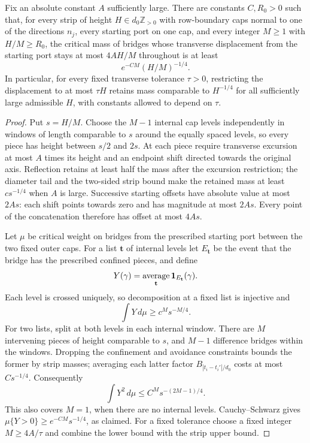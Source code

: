 \begin{lemma}\label{lem:narrow-channel-bridges}
Fix an absolute constant $A$ sufficiently large. There are constants $C,R_0>0$ such that, for every strip of height $H\in d_0\mathbb Z_{>0}$ with row-boundary caps normal to one of the directions $n_j$, every starting port on one cap, and every integer $M\ge1$ with $H/M\ge R_0$, the critical mass of bridges whose transverse displacement from the starting port stays at most $4AH/M$ throughout is at least
\[
 e^{-C M} (H/M)^{-1/4}.
\]
In particular, for every fixed transverse tolerance $\tau>0$, restricting the displacement to at most $\tau H$ retains mass comparable to $H^{-1/4}$ for all sufficiently large admissible $H$, with constants allowed to depend on $\tau$.
\end{lemma}
\begin{proof}
Put \(s=H/M\). Choose the \(M-1\) internal cap levels independently in windows of length comparable to \(s\) around the equally spaced levels, so every piece has height between \(s/2\) and \(2s\). At each piece require transverse excursion at most \(A\) times its height and an endpoint shift directed towards the original axis. Reflection retains at least half the mass after the excursion restriction; the diameter tail and the two-sided strip bound make the retained mass at least \(c s^{-1/4}\) when \(A\) is large. Successive starting offsets have absolute value at most \(2As\): each shift points towards zero and has magnitude at most \(2As\). Every point of the concatenation therefore has offset at most \(4As\).

Let \(\mu\) be critical weight on bridges from the prescribed starting port between the two fixed outer caps. For a list \(\mathbf t\) of internal levels let \(E_{\mathbf t}\) be the event that the bridge has the prescribed confined pieces, and define
\[
 Y(\gamma)=\mathop{\mathrm{average}}_{\mathbf t}
           {\bf1}_{E_{\mathbf t}}(\gamma).
\]
Each level is crossed uniquely, so decomposition at a fixed list is injective and
\[
 \int Y\,d\mu\ge c^M s^{-M/4}.
\]
For two lists, split at both levels in each internal window. There are \(M\) intervening pieces of height comparable to \(s\), and \(M-1\) difference bridges within the windows. Dropping the confinement and avoidance constraints bounds the former by strip masses; averaging each latter factor \(B_{|t_i-t_i'|/d_0}\) costs at most \(Cs^{-1/4}\). Consequently
\[
 \int Y^2\,d\mu\le C^M s^{-(2M-1)/4}.
\]
This also covers \(M=1\), when there are no internal levels. Cauchy--Schwarz gives
\(\mu\{Y>0\}\ge e^{-CM}s^{-1/4}\), as claimed. For a fixed tolerance choose a fixed integer \(M\ge4A/\tau\) and combine the lower bound with the strip upper bound.

\end{proof}

